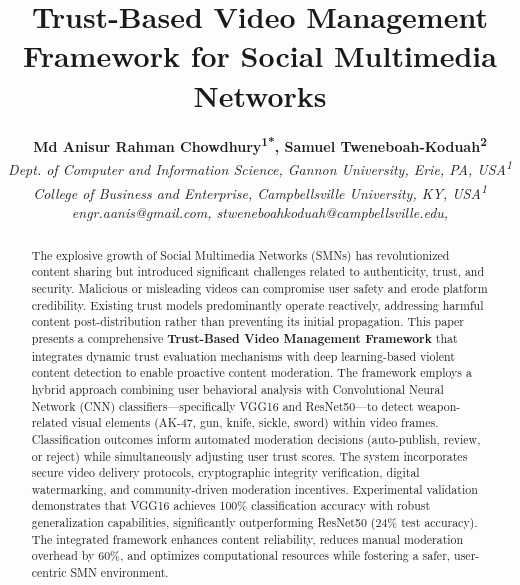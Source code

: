 \documentclass[conference]{IEEEtran}
\begin{document}
\title{Trust-Based Video Management Framework for Social Multimedia Networks}

\author{
\centering
\begin{tabular}{c}
\textbf{Md Anisur Rahman Chowdhury\textsuperscript{1*}, Samuel Tweneboah-Koduah\textsuperscript{2} }\\
\textit{Dept. of Computer and Information Science, Gannon University, Erie, PA, USA\textsuperscript{1}} \\
\textit{College of Business and Enterprise, Campbellsville University, KY, USA\textsuperscript{1}} \\
\textit{\small engr.aanis@gmail.com, stweneboahkoduah@campbellsville.edu,}\\\end{tabular}
}

\maketitle

\begin{abstract}
The explosive growth of Social Multimedia Networks (SMNs) has revolutionized content sharing but introduced significant challenges related to authenticity, trust, and security. Malicious or misleading videos can compromise user safety and erode platform credibility. Existing trust models predominantly operate reactively, addressing harmful content post-distribution rather than preventing its initial propagation. This paper presents a comprehensive \textbf{Trust-Based Video Management Framework} that integrates dynamic trust evaluation mechanisms with deep learning-based violent content detection to enable proactive content moderation. The framework employs a hybrid approach combining user behavioral analysis with Convolutional Neural Network (CNN) classifiers—specifically VGG16 and ResNet50—to detect weapon-related visual elements (AK-47, gun, knife, sickle, sword) within video frames. Classification outcomes inform automated moderation decisions (auto-publish, review, or reject) while simultaneously adjusting user trust scores. The system incorporates secure video delivery protocols, cryptographic integrity verification, digital watermarking, and community-driven moderation incentives. Experimental validation demonstrates that VGG16 achieves 100\% classification accuracy with robust generalization capabilities, significantly outperforming ResNet50 (24\% test accuracy). The integrated framework enhances content reliability, reduces manual moderation overhead by 60\%, and optimizes computational resources while fostering a safer, user-centric SMN environment.
\end{abstract}
\end{document}
